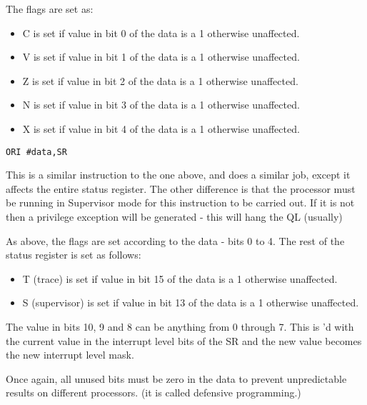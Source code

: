 The flags are set as:
\begin{itemize}[itemsep=0pt]

\item{}C is set if value in bit 0 of the data is a 1 otherwise
        unaffected.


\item{}V is set if value in bit 1 of the data is a 1 otherwise
        unaffected.


\item{}Z is set if value in bit 2 of the data is a 1 otherwise
        unaffected.


\item{}N is set if value in bit 3 of the data is a 1 otherwise
        unaffected.


\item{}X is set if value in bit 4 of the data is a 1 otherwise
        unaffected.

\end{itemize}

\begin{lstlisting}[firstnumber=1,]
          ORI #data,SR 
\end{lstlisting}

This is a similar instruction to the one above, and does a similar
    job, except it affects the entire status register. The other difference is
    that the processor must be running in Supervisor mode for this instruction
    to be carried out. If it is not then a privilege exception will be
    generated -{} this will hang the QL (usually)

As above, the flags are set according to the data -{} bits 0 to 4. The
    rest of the status register is set as follows:
\begin{itemize}[itemsep=0pt]

\item{}T (trace) is set if value in bit 15 of the data is a 1 otherwise
        unaffected.


\item{}S (supervisor) is set if value in bit 13 of the data is a 1
        otherwise unaffected.

\end{itemize}

The value in bits 10, 9 and 8 can be anything from 0 through 7. This
    is 'd with the current value in the interrupt level bits of the SR and
    the new value becomes the new interrupt level mask.

Once again, all unused bits must be zero in the data to prevent
    unpredictable results on different processors. (it is called defensive
    programming.)

